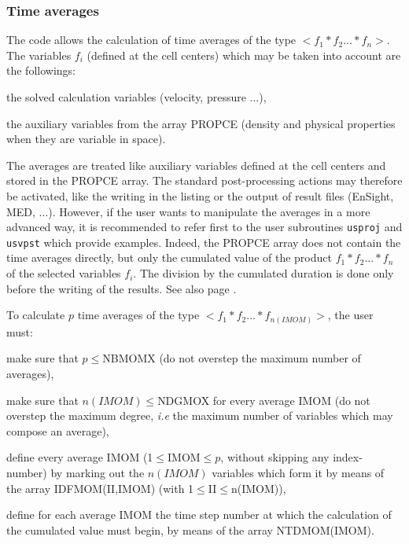 \subsubsection{Time averages}

The code allows the calculation of time averages of the type
$<f_1*f_2...*f_n>$. The variables $f_i$ (defined at the cell centers)
which may be taken into account are the followings:
\begin{list}{-}{}
\item the solved calculation variables (velocity, pressure ...),
\item the auxiliary variables from the array PROPCE (density and
      physical properties when they are variable in space).
\end{list}

The averages are treated like auxiliary variables defined at the cell
centers and stored in the PROPCE array. The standard post-processing
actions may therefore be activated, like the writing in the listing or
the output of result files (EnSight, MED, ...). However, if the user
wants to manipulate the averages in a more advanced way, it is
recommended to refer first to the user subroutines \texttt{usproj} and
\texttt{usvpst} which provide examples. Indeed, the PROPCE array
does not contain the time averages directly, but only the cumulated value
of the product $f_1*f_2...*f_n$ of the selected
variables $f_i$. The division by the cumulated duration is done only
before the writing of the results. See also page \pageref{prg_moyennes}.

To calculate $p$ time averages of the type $<f_1*f_2...*f_{n(IMOM)}>$,
the user must:
\begin{list}{-}{}
\item make sure that $p\leqslant$NBMOMX (do not overstep the maximum
      number of averages),
\item make sure that $n(IMOM)\leqslant$NDGMOX for every average IMOM
       (do not overstep the maximum degree, {\it i.e} the maximum number
       of variables which may compose an average),
\item define every average IMOM (1$\leqslant$IMOM$\leqslant p$, without
      skipping any index-number) by marking out the $n(IMOM)$ variables
      which form it by means of the array IDFMOM(II,IMOM) (with
      1$\leqslant$II$\leqslant$n(IMOM)),
\item define for each average IMOM the time step number at which the
      calculation of the cumulated value must begin, by means of the
      array NTDMOM(IMOM).
\end{list}

